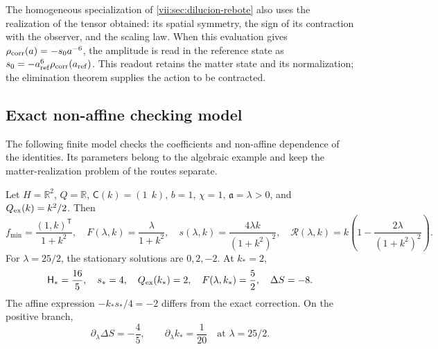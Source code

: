 The homogeneous specialization of
\ref{vii:sec:dilucion-rebote} also uses the realization of the
tensor obtained: its spatial symmetry, the sign of its contraction
with the observer, and the scaling law. When this evaluation gives
\(\rho_{\rm corr}(a)=-s_0a^{-6}\), the amplitude is read in the
reference state as
\(s_0=-a_{\rm ref}^{6}\rho_{\rm corr}(a_{\rm ref})\).
This readout retains the matter state and its normalization; the
elimination theorem supplies the action to be contracted.

\subsection{Exact non-affine checking model}
\label{vii:subsec:control-no-afin}

The following finite model checks the coefficients and non-affine
dependence of the identities. Its parameters belong to the algebraic
example and keep the matter-realization problem of the routes separate.

\begin{proposition}
\label{vii:prop:ejemplo-no-afin}
Let \(H=\mathbb R^2\), \(Q=\mathbb R\),
\(\mathsf C(k)=(1\ \ k)\), \(b=1\), \(\chi=1\),
\(\mathfrak a=\lambda>0\), and \(Q_{\rm ex}(k)=k^2/2\).
Then
\begin{equation}
 f_{\min}=\frac{(1,k)^{\mathsf T}}{1+k^2},\quad
 F(\lambda,k)=\frac{\lambda}{1+k^2},\quad
 s(\lambda,k)=\frac{4\lambda k}{(1+k^2)^2},\quad
 \mathcal R(\lambda,k)
    =k\left(1-\frac{2\lambda}{(1+k^2)^2}\right).
 \label{vii:eq:ejemplo-minimo-no-afin}
\end{equation}
For \(\lambda=25/2\), the stationary solutions are
\(0,2,-2\). At \(k_*=2\),
\begin{equation}
 \mathsf H_*=\frac{16}{5},\quad s_*=4,\quad
 Q_{\rm ex}(k_*)=2,\quad F(\lambda,k_*)=\frac52,
 \quad \Delta S=-8.
 \label{vii:eq:valores-ejemplo-no-afin}
\end{equation}
The affine expression \(-k_*s_*/4=-2\) differs from the exact
correction. On the positive branch,
\begin{equation}
 \partial_\lambda\Delta S=-\frac45,
 \qquad \partial_\lambda k_* =\frac1{20}
 \quad\text{at }\lambda=25/2.
 \label{vii:eq:derivadas-ejemplo-no-afin}
\end{equation}
\end{proposition}


